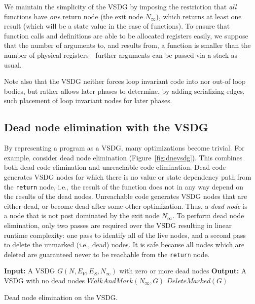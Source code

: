 {\medskip

We maintain the simplicity of the VSDG by imposing the restriction that \emph{all} functions have \emph{one} return node (the exit node $N_\infty$), which returns at least one result (which will be a state value in the case of  functions). 
To ensure that function calls and definitions are able to be allocated registers easily, we suppose that the number of arguments to, and results from, a function is smaller than the number of physical registers---further arguments can be passed via a stack as usual.

Note also that the VSDG neither forces loop invariant code into nor out-of loop bodies, but rather allows later phases to determine, by adding serializing edges, such placement of loop invariant nodes for later phases.

\subsection{Dead node elimination with the VSDG}
By representing a program as a VSDG, many optimizations become trivial. 
For example, consider dead node elimination (Figure~\ref{fig:dnevsdg}). 
This combines both dead code elimination and unreachable code elimination. 
Dead code generates VSDG nodes for which there is no value or state dependency path from the \texttt{return} node, i.e., the result of the function does not in any way depend on the results of the dead nodes. 
Unreachable code generates VSDG nodes that are either dead, or become dead after some other optimization. 
Thus, a \textit{dead node} is a node that is not post dominated by the exit node $N_{\infty}$. 
To perform dead node elimination, only two passes are required over the VSDG resulting in linear runtime complexity: 
one pass to identify all of the live nodes, and a second pass to delete the unmarked (i.e., dead) nodes. 
It is safe because all nodes which are deleted are guaranteed never to be reachable from the \texttt{return} node.

\begin{algorithm}[!ht]
{\bf Input:} A VSDG $G(N,E_V,E_S,N_{\infty})$ with zero or more dead nodes\;
{\bf Output:} A VSDG with no dead nodes\;
$\textit{WalkAndMark}(N_{\infty},G)$\;
$\textit{DeleteMarked}(G)$\;
\vspace{1em}
\vspace{1em}
\caption{Dead node elimination on the VSDG.}
\label{fig:dnevsdg}
\end{algorithm}

}
